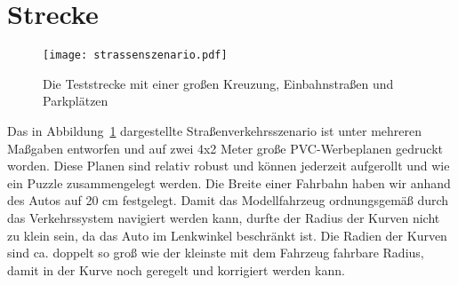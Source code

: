 \section{Strecke}

\begin{figure}[H] %
  \centering
  \texttt{[image: strassenszenario.pdf]}
  \caption{Die Teststrecke mit einer großen Kreuzung, Einbahnstraßen und Parkplätzen}
  \label{fig:strassenszenario}
\end{figure}

Das in Abbildung~\ref{fig:strassenszenario} dargestellte Straßenverkehrsszenario ist unter mehreren Maßgaben entworfen und auf zwei 4x2 Meter große PVC-Werbeplanen gedruckt worden. Diese Planen sind relativ robust und können jederzeit aufgerollt und wie ein Puzzle zusammengelegt werden. Die Breite einer Fahrbahn haben wir anhand des Autos auf 20 cm festgelegt. Damit das Modellfahrzeug ordnungsgemäß durch das Verkehrssystem navigiert werden kann, durfte der Radius der Kurven nicht zu klein sein, da das Auto im Lenkwinkel beschränkt ist. Die Radien der Kurven sind ca. doppelt so groß wie der kleinste mit dem Fahrzeug fahrbare Radius, damit in der Kurve noch geregelt und korrigiert werden kann.  
